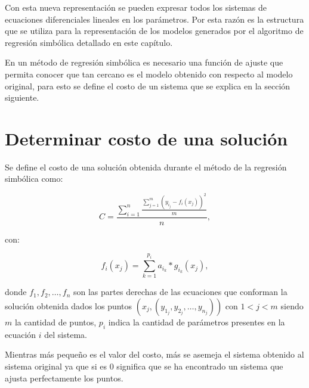 \begin{center}
\end{center}

Con esta nueva representación se pueden expresar todos los sistemas de ecuaciones diferenciales lineales en los parámetros. Por esta razón es la estructura que se utiliza para la representación de los modelos generados por el algoritmo de regresión simbólica detallado en este capítulo.

En un método de regresión simbólica es necesario una función de ajuste que permita conocer que tan cercano es el modelo obtenido con respecto al modelo original, para esto se define el costo de un sistema que se explica en la sección siguiente.

\section{Determinar costo de una solución}

Se define el costo de una solución obtenida durante el método de la regresión simbólica como:

$$C = \frac{\sum_{i=1}^n\frac{\sum_{j=1}^{m}(y_{i_j} - f_i(x_j))^2}{m}}{n},$$

con:

$$f_i(x_j) = \sum_{k=1}^{p_i} a_{i_k} * g_{i_k}(x_j),$$

donde $f_1, f_2, \dots, f_n$ son las partes derechas de las ecuaciones que conforman la solución obtenida dados los puntos $(x_j, (y_{1_j}, y_{2_j}, \dots, y_{n_j}))$  con $1 < j < m$ siendo $m$ la cantidad de puntos, $p_i$ indica la cantidad de parámetros presentes en la ecuación $i$ del sistema.

Mientras más pequeño es el valor del costo, más se asemeja el sistema obtenido al sistema original ya que si es 0 significa que se ha encontrado un sistema que ajusta perfectamente los puntos.

